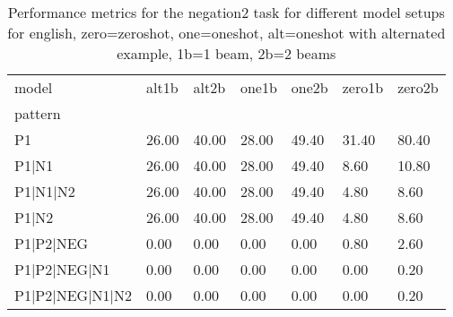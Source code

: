 \begin{table}[h]
\begin{tabular}{l|llllll}
\toprule
model & alt1b & alt2b & one1b & one2b & zero1b & zero2b \\
pattern &  &  &  &  &  &  \\
\midrule
P1 & 26.00 & 40.00 & 28.00 & 49.40 & 31.40 & 80.40 \\
P1|N1 & 26.00 & 40.00 & 28.00 & 49.40 & 8.60 & 10.80 \\
P1|N1|N2 & 26.00 & 40.00 & 28.00 & 49.40 & 4.80 & 8.60 \\
P1|N2 & 26.00 & 40.00 & 28.00 & 49.40 & 4.80 & 8.60 \\
P1|P2|NEG & 0.00 & 0.00 & 0.00 & 0.00 & 0.80 & 2.60 \\
P1|P2|NEG|N1 & 0.00 & 0.00 & 0.00 & 0.00 & 0.00 & 0.20 \\
P1|P2|NEG|N1|N2 & 0.00 & 0.00 & 0.00 & 0.00 & 0.00 & 0.20 \\
\bottomrule
\end{tabular}
\caption{Performance metrics for the negation2 task for different model setups for english, zero=zeroshot, one=oneshot, alt=oneshot with alternated example, 1b=1 beam, 2b=2 beams}
\label{tab:en_negation2_performance}
\end{table}
